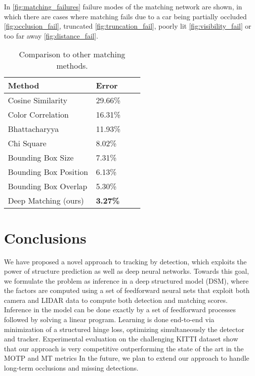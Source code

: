 \documentclass[letterpaper, 10 pt, conference]{ieeeconf}  \pdfminorversion=4
\newcommand{\raquel}[1]{}
\begin{document}
In \autoref{fig:matching_failures} failure modes of the matching network are shown, in which there are cases where matching fails due to a car being partially occluded \ref{fig:occlusion_fail}, truncated \ref{fig:truncation_fail}, poorly lit \ref{fig:visibility_fail} or too far away \ref{fig:distance_fail}.

\begin{table}[t]
 \centering
 \begin{tabular}{l|lll}
   \hline
   Method & Error\\ \hline
   Cosine Similarity & 29.66\%\\
   Color Correlation & 16.31\%\\
   Bhattacharyya & 11.93\% \\
   Chi Square & 8.02\% \\
   Bounding Box Size & 7.31\% \\
   Bounding Box Position & 6.13\% \\
   Bounding Box Overlap & 5.30\% \\\hline
   Deep Matching (ours) & \textbf{3.27\%} \\
 \end{tabular}
 \caption{Comparison to other matching methods.}
\label{tab:matching-results}
\vspace{-0.05cm}
\end{table}

 \section{Conclusions}
\label{sec:conclusion}

We have proposed a novel approach to tracking by detection, which exploits the power of structure prediction as well as deep neural networks. Towards this goal, we formulate the problem as inference in a deep structured model (DSM), where the factors are computed using a set of feedforward neural nets that exploit both camera and LIDAR data to compute both detection and matching scores. Inference in the model can be done exactly by a set of feedforward processes followed by solving a linear program. Learning is done end-to-end via minimization of a structured hinge loss, optimizing simultaneously the detector and tracker.
Experimental evaluation on the challenging KITTI dataset show that our approach is very competitive outperforming the state of the art in the MOTP and MT metrics \raquel{say which metrics.} 
In the future, we plan to  extend our  approach to handle long-term occlusions and missing detections.





 

\end{document}
